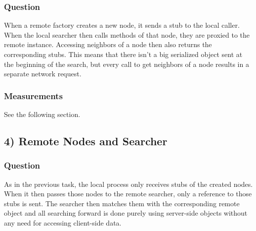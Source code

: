 \documentclass{scrartcl}
\begin{document}
    \subsubsection*{Question}
    When a remote factory creates a new node, it sends a stub to the local caller. When the local searcher then calls methods of that node, they are proxied to the remote instance. Accessing neighbors of a node then also returns the corresponding stubs. This means that there isn't a big serialized object sent at the beginning of the search, but every call to get neighbors of a node results in a separate network request.

    \subsubsection*{Measurements}
    See the following section.
    \subsection*{4) Remote Nodes and Searcher}
    \subsubsection*{Question}
    As in the previous task, the local process only receives stubs of the created nodes. When it then passes those nodes to the remote searcher, only a reference to those stubs is sent. The searcher then matches them with the corresponding remote object and all searching forward is done purely using server-side objects without any need for accessing client-side data. 
\end{document}
